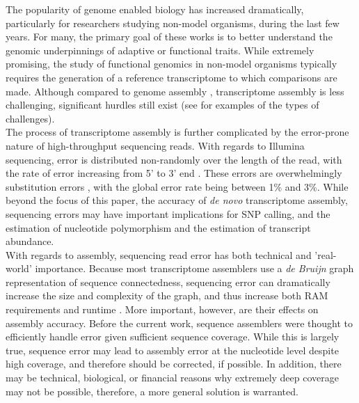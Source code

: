 \documentclass[11pt]{article}
\begin{document}
\doublespacing
\noindent
The popularity of genome enabled biology has increased dramatically, particularly for researchers studying non-model organisms, during the last few years.  For many, the primary goal of these works is to better understand the genomic underpinnings of adaptive \citep{Linnen:2013ir,Narum:2013kc} or functional \citep{MunozMerida:2013dw,Hsu:2012dg} traits. While extremely promising, the study of functional genomics in non-model organisms typically requires the generation of a reference transcriptome to which comparisons are made.  Although compared to genome assembly \citep{Bradnam:2013uu,Earl:2011gt}, transcriptome assembly is less challenging, significant hurdles still exist (see \cite{Francis:2013gc,Vijay:2012gy,Pyrkosz:2013tm} for examples of the types of challenges). \\

\noindent
The process of transcriptome assembly is further complicated by the error-prone nature of high-throughput sequencing reads.  With regards to Illumina sequencing, error is distributed non-randomly over the length of the read, with the rate of error increasing from 5' to 3' end \citep{Liu:2012iv}. These errors are overwhelmingly substitution errors \citep{Yang:2013ck}, with the global error rate being between 1\% and 3\%.    While beyond the focus of this paper, the accuracy of \textit{de novo} transcriptome assembly, sequencing errors may have important implications for SNP calling, and the estimation of nucleotide polymorphism and the estimation of transcript abundance. \\

\noindent
With regards to assembly, sequencing read error has both technical and 'real-world' importance. Because most transcriptome assemblers use a \textit{de Bruijn} graph representation of sequence connectedness, sequencing error can dramatically increase the size and complexity of the graph, and thus increase both RAM requirements and runtime \citep{Conway:2011iv,Pell:2012id}. More important, however, are their effects on assembly accuracy. Before the current work, sequence assemblers were thought to efficiently handle error given sufficient sequence coverage. While this is largely true, sequence error may lead to assembly error at the nucleotide level despite high coverage, and therefore should be corrected, if possible. In addition, there may be technical, biological, or financial reasons why extremely deep coverage may not be possible, therefore, a more general solution is warranted.  \\ 
\end{document}
